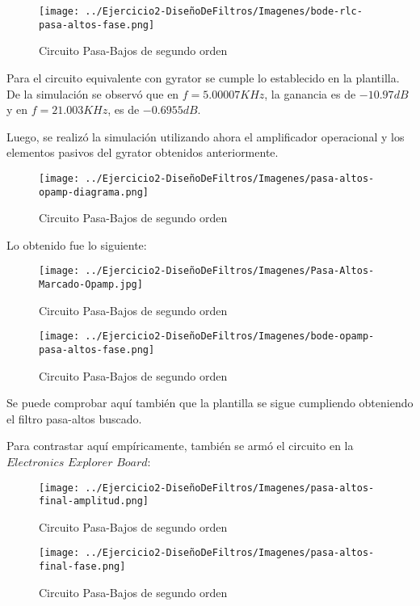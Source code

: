 \begin{figure}[H]
    \centering
    \texttt{[image: ../Ejercicio2-DiseñoDeFiltros/Imagenes/bode-rlc-pasa-altos-fase.png]}
    \caption{Circuito Pasa-Bajos de segundo orden}
\end{figure}

Para el circuito equivalente con gyrator se cumple lo establecido en la plantilla.
De la simulación se observó que en $f=5.00007 KHz$, la ganancia es de $-10.97 dB$ y en $f=21.003KHz$, es de $-0.6955 dB$.

Luego, se realizó la simulación utilizando ahora el amplificador operacional y los elementos pasivos del gyrator obtenidos anteriormente.

\begin{figure}[H]
    \centering
    \texttt{[image: ../Ejercicio2-DiseñoDeFiltros/Imagenes/pasa-altos-opamp-diagrama.png]}
    \caption{Circuito Pasa-Bajos de segundo orden}
\end{figure}

Lo obtenido fue lo siguiente:

\begin{figure}[H]
    \centering
    \texttt{[image: ../Ejercicio2-DiseñoDeFiltros/Imagenes/Pasa-Altos-Marcado-Opamp.jpg]}
    \caption{Circuito Pasa-Bajos de segundo orden}
\end{figure}

\begin{figure}[H]
    \centering
    \texttt{[image: ../Ejercicio2-DiseñoDeFiltros/Imagenes/bode-opamp-pasa-altos-fase.png]}
    \caption{Circuito Pasa-Bajos de segundo orden}
\end{figure}

Se puede comprobar aquí también que la plantilla se sigue cumpliendo obteniendo el filtro pasa-altos buscado.

Para contrastar aquí empíricamente, también se armó el circuito en la $Electronics$ $Explorer$ $Board$:

\begin{figure}[H]
    \centering
    \texttt{[image: ../Ejercicio2-DiseñoDeFiltros/Imagenes/pasa-altos-final-amplitud.png]}
    \caption{Circuito Pasa-Bajos de segundo orden}
\end{figure}

\begin{figure}[H]
    \centering
    \texttt{[image: ../Ejercicio2-DiseñoDeFiltros/Imagenes/pasa-altos-final-fase.png]}
    \caption{Circuito Pasa-Bajos de segundo orden}
\end{figure}


